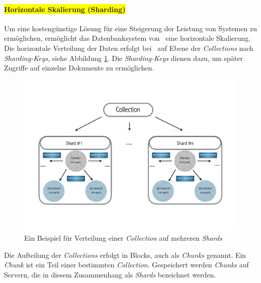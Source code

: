 \paragraph{\colorbox{yellow}{Horizontale Skalierung (Sharding)}}\label{sharding}

Um eine kostengünstige Lösung für eine Steigerung der Leistung von Systemen zu ermöglichen, ermöglicht das Datenbanksystem von \mongo\  eine horizontale Skalierung. Die horizontale Verteilung der Daten erfolgt bei \mongo\ auf Ebene der \textit{Collections} nach \textit{Sharding-Keys}, siehe Abbildung \ref{img:sharding}. Die \textit{Sharding-Keys} dienen dazu, um später Zugriffe auf einzelne Dokumente zu ermöglichen.
\begin{figure}[H]
\centering
\includegraphics[trim = 0mm 35mm 0mm 30mm, clip, width=1.0\textwidth]{resources/replicaSet/sharding}
\caption[Ein Beispiel für Verteilung einer \textit{Collection} auf mehreren \textit{Shards}]{Ein Beispiel für Verteilung einer \textit{Collection} auf mehreren \textit{Shards}}
\label{img:sharding}
\end{figure}
Die Aufteilung der \textit{Collections} erfolgt in Blocks, auch als \textit{Chunks} genannt. Ein \textit{Chunk} ist ein Teil einer bestimmten \textit{Collection}. Gespeichert werden \textit{Chunks} auf Servern, die in diesem Zusammenhang als \textit{Shards} bezeichnet werden.


